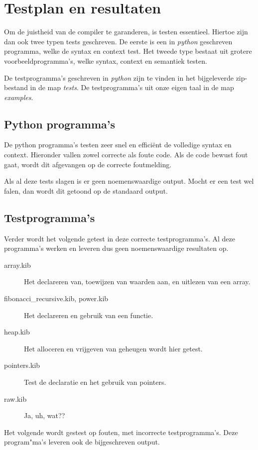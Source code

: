 \chapter{Testplan en resultaten} %
\label{cha:testplan_en_resultaten}
Om de juistheid van de compiler te garanderen, is testen essentieel. Hiertoe zijn dan ook twee typen tests geschreven. De eerste is een in \emph{python} geschreven programma, welke de syntax en context test. Het tweede type bestaat uit grotere voorbeeldprogramma's, welke syntax, context en semantiek testen.

De testprogramma's geschreven in \emph{python} zijn te vinden in het bijgeleverde zip-bestand in de map \emph{tests}. De testprogramma's uit onze eigen taal in de map \emph{examples}.

\section{Python programma's} %
\label{sec:python_programma_s}
De python programma's testen zeer snel en effici\"ent de volledige syntax en context. Hieronder vallen zowel correcte als foute code. Als de code bewust fout gaat, wordt dit afgevangen op de correcte foutmelding. 

Als al deze tests slagen is er geen noemenswaardige output. Mocht er een test wel falen, dan wordt dit getoond op de standaard output.

\section{Testprogramma's} %
\label{sec:testprogramma_s}

Verder wordt het volgende getest in deze correcte testprogramma's. Al deze programma's werken en leveren dus geen noemenswaardige resultaten op.
\begin{description}
    \item[array.kib] Het declareren van, toewijzen van waarden aan, en uitlezen van een array.
    \item[fibonacci\_recursive.kib, power.kib] Het declareren en gebruik van een functie.
    \item[heap.kib] Het alloceren en vrijgeven van geheugen wordt hier getest. 
    \item[pointers.kib] Test de declaratie en het gebruik van pointers.
    \item[raw.kib] Ja, uh, wat??
\end{description}

Het volgende wordt gestest op fouten, met incorrecte testprogramma's. Deze program"ma's leveren ook de bijgeschreven output.
\begin{description}
    \item[] 
\end{description}

\clearpage